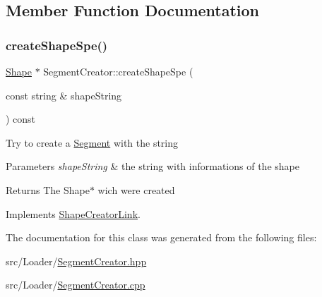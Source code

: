 \subsection{Member Function Documentation}
\hypertarget{class_segment_creator_ab19a7665cba20a6e0b44c57b3cb4ce77}{}\label{class_segment_creator_ab19a7665cba20a6e0b44c57b3cb4ce77} 
\subsubsection{\texorpdfstring{create\+Shape\+Spe()}{createShapeSpe()}}
{\footnotesize\ttfamily \hyperlink{class_shape}{Shape} $\ast$ Segment\+Creator\+::create\+Shape\+Spe (\begin{DoxyParamCaption}\item[{const string \&}]{shape\+String }\end{DoxyParamCaption}) const\hspace{0.3cm}{\ttfamily [virtual]}}

Try to create a \hyperlink{class_segment}{Segment} with the string 
\begin{DoxyParams}{Parameters}
{\em shape\+String} & the string with informations of the shape \\
\hline
\end{DoxyParams}
\begin{DoxyReturn}{Returns}
The Shape$\ast$ wich were created 
\end{DoxyReturn}


Implements \hyperlink{class_shape_creator_link_a036ecc845946d23b36335e9077308bcf}{Shape\+Creator\+Link}.



The documentation for this class was generated from the following files\+:\begin{DoxyCompactItemize}
\item 
src/\+Loader/\hyperlink{_segment_creator_8hpp}{Segment\+Creator.\+hpp}\item 
src/\+Loader/\hyperlink{_segment_creator_8cpp}{Segment\+Creator.\+cpp}\end{DoxyCompactItemize}
